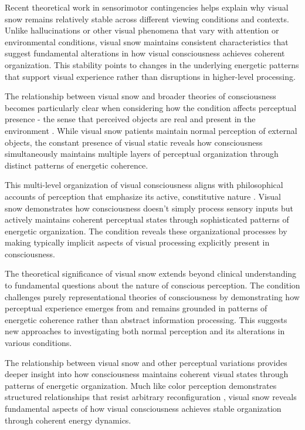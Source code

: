 \begin{refsection}
Recent theoretical work in sensorimotor contingencies \cite{Seth2014} helps explain why visual snow remains relatively stable across different viewing conditions and contexts. Unlike hallucinations or other visual phenomena that vary with attention or environmental conditions, visual snow maintains consistent characteristics that suggest fundamental alterations in how visual consciousness achieves coherent organization. This stability points to changes in the underlying energetic patterns that support visual experience rather than disruptions in higher-level processing.

The relationship between visual snow and broader theories of consciousness becomes particularly clear when considering how the condition affects perceptual presence - the sense that perceived objects are real and present in the environment \cite{Seth2014}. While visual snow patients maintain normal perception of external objects, the constant presence of visual static reveals how consciousness simultaneously maintains multiple layers of perceptual organization through distinct patterns of energetic coherence.

This multi-level organization of visual consciousness aligns with philosophical accounts of perception that emphasize its active, constitutive nature \cite{Noe2004}. Visual snow demonstrates how consciousness doesn't simply process sensory inputs but actively maintains coherent perceptual states through sophisticated patterns of energetic organization. The condition reveals these organizational processes by making typically implicit aspects of visual processing explicitly present in consciousness.

The theoretical significance of visual snow extends beyond clinical understanding to fundamental questions about the nature of conscious perception. The condition challenges purely representational theories of consciousness \cite{Metzinger2003} by demonstrating how perceptual experience emerges from and remains grounded in patterns of energetic coherence rather than abstract information processing. This suggests new approaches to investigating both normal perception and its alterations in various conditions.

The relationship between visual snow and other perceptual variations provides deeper insight into how consciousness maintains coherent visual states through patterns of energetic organization. Much like color perception demonstrates structured relationships that resist arbitrary reconfiguration \cite{Palmer1999}, visual snow reveals fundamental aspects of how visual consciousness achieves stable organization through coherent energy dynamics.


\end{refsection}
